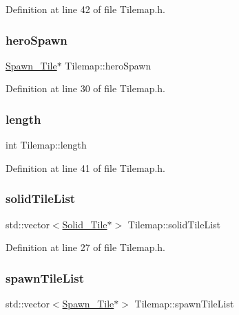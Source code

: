 Definition at line 42 of file Tilemap.\+h.

\hypertarget{class_tilemap_a0b9b8cb0dae83e1729ac5d1cc8411395}{}\label{class_tilemap_a0b9b8cb0dae83e1729ac5d1cc8411395} 
\subsubsection{\texorpdfstring{hero\+Spawn}{heroSpawn}}
{\footnotesize\ttfamily \hyperlink{class_spawn___tile}{Spawn\+\_\+\+Tile}$\ast$ Tilemap\+::hero\+Spawn}



Definition at line 30 of file Tilemap.\+h.

\hypertarget{class_tilemap_a20a5ecfd38a3612d4294eb19da4f36ea}{}\label{class_tilemap_a20a5ecfd38a3612d4294eb19da4f36ea} 
\subsubsection{\texorpdfstring{length}{length}}
{\footnotesize\ttfamily int Tilemap\+::length}



Definition at line 41 of file Tilemap.\+h.

\hypertarget{class_tilemap_aecd9cc5f70702439e13fd6213d176f14}{}\label{class_tilemap_aecd9cc5f70702439e13fd6213d176f14} 
\subsubsection{\texorpdfstring{solid\+Tile\+List}{solidTileList}}
{\footnotesize\ttfamily std\+::vector$<$\hyperlink{class_solid___tile}{Solid\+\_\+\+Tile}$\ast$$>$ Tilemap\+::solid\+Tile\+List}



Definition at line 27 of file Tilemap.\+h.

\hypertarget{class_tilemap_a41ae114e32893255ef339dd26c635039}{}\label{class_tilemap_a41ae114e32893255ef339dd26c635039} 
\subsubsection{\texorpdfstring{spawn\+Tile\+List}{spawnTileList}}
{\footnotesize\ttfamily std\+::vector$<$\hyperlink{class_spawn___tile}{Spawn\+\_\+\+Tile}$\ast$$>$ Tilemap\+::spawn\+Tile\+List}



